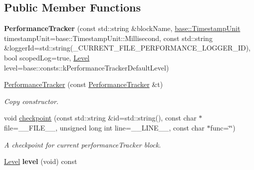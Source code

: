 \subsection*{Public Member Functions}
\begin{DoxyCompactItemize}
\item 
\hypertarget{classel_1_1base_1_1PerformanceTracker_a1794044d78f649890b2a0c48f56b11ef}{{\bfseries Performance\-Tracker} (const std\-::string \&block\-Name, \hyperlink{namespaceel_1_1base_a1b886858c6409097395b24b1bdf03c39}{base\-::\-Timestamp\-Unit} timestamp\-Unit=base\-::\-Timestamp\-Unit\-::\-Millisecond, const std\-::string \&logger\-Id=std\-::string(\-\_\-\-C\-U\-R\-R\-E\-N\-T\-\_\-\-F\-I\-L\-E\-\_\-\-P\-E\-R\-F\-O\-R\-M\-A\-N\-C\-E\-\_\-\-L\-O\-G\-G\-E\-R\-\_\-\-I\-D), bool scoped\-Log=true, \hyperlink{namespaceel_ab0ac6091262344c52dd2d3ad099e8e36}{Level} level=base\-::consts\-::k\-Performance\-Tracker\-Default\-Level)}\label{classel_1_1base_1_1PerformanceTracker_a1794044d78f649890b2a0c48f56b11ef}

\item 
\hypertarget{classel_1_1base_1_1PerformanceTracker_a49e655c1f414f904b2d6a9abb0d344f4}{\hyperlink{classel_1_1base_1_1PerformanceTracker_a49e655c1f414f904b2d6a9abb0d344f4}{Performance\-Tracker} (const \hyperlink{classel_1_1base_1_1PerformanceTracker}{Performance\-Tracker} \&t)}\label{classel_1_1base_1_1PerformanceTracker_a49e655c1f414f904b2d6a9abb0d344f4}

\begin{DoxyCompactList}\small\item\em Copy constructor. \end{DoxyCompactList}\item 
\hypertarget{classel_1_1base_1_1PerformanceTracker_aec9a6e149674c5782cc855e49aeb0aaf}{void \hyperlink{classel_1_1base_1_1PerformanceTracker_aec9a6e149674c5782cc855e49aeb0aaf}{checkpoint} (const std\-::string \&id=std\-::string(), const char $\ast$file=\-\_\-\-\_\-\-F\-I\-L\-E\-\_\-\-\_\-, unsigned long int line=\-\_\-\-\_\-\-L\-I\-N\-E\-\_\-\-\_\-, const char $\ast$func=\char`\"{}\char`\"{})}\label{classel_1_1base_1_1PerformanceTracker_aec9a6e149674c5782cc855e49aeb0aaf}

\begin{DoxyCompactList}\small\item\em A checkpoint for current performance\-Tracker block. \end{DoxyCompactList}\item 
\hypertarget{classel_1_1base_1_1PerformanceTracker_a3e0ebd666cc7416dc9b818418266161b}{\hyperlink{namespaceel_ab0ac6091262344c52dd2d3ad099e8e36}{Level} {\bfseries level} (void) const }\label{classel_1_1base_1_1PerformanceTracker_a3e0ebd666cc7416dc9b818418266161b}

\end{DoxyCompactItemize}
